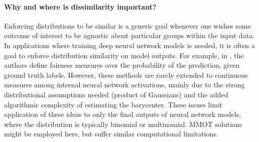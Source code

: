 \paragraph{Why and where is dissimilarity important?}
Enforcing distributions to be similar is a generic goal whenever one wishes some outcome of interest to be agnostic about particular groups within the input data.
In applications where training deep neural network models is needed,
it is often a goal to enforce distribution similarity on model outputs. 
For example, in \cite{jiang2020wasserstein}, the authors define fairness measures over the probability of the prediction, given ground truth labels.   
% 
However, these methods are rarely extended to continuous measures 
among internal neural network activations,
mainly due to the strong distributional assumptions needed (product of Gaussians) and the added algorithmic complexity of estimating the barycenter.
These issues limit application of these ideas 
to only the final outputs of neural network models, where the distribution is typically binomial or multinomial.
MMOT solutions might be employed here, but suffer similar computational limitations.

